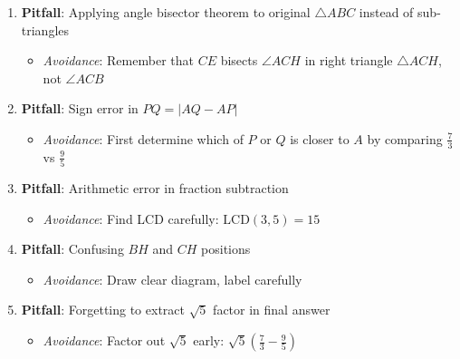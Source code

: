 \documentclass[12pt]{article}
\begin{document}
\begin{roadmapbox}
\begin{enumerate}
    \item \textbf{Pitfall}: Applying angle bisector theorem to original $\triangle ABC$ instead of sub-triangles
    \begin{itemize}
        \item \textit{Avoidance}: Remember that $CE$ bisects $\angle ACH$ in right triangle $\triangle ACH$, not $\angle ACB$
    \end{itemize}
    \item \textbf{Pitfall}: Sign error in $PQ = |AQ - AP|$
    \begin{itemize}
        \item \textit{Avoidance}: First determine which of $P$ or $Q$ is closer to $A$ by comparing $\frac{7}{3}$ vs $\frac{9}{5}$
    \end{itemize}
    \item \textbf{Pitfall}: Arithmetic error in fraction subtraction
    \begin{itemize}
        \item \textit{Avoidance}: Find LCD carefully: $\text{LCD}(3,5) = 15$
    \end{itemize}
    \item \textbf{Pitfall}: Confusing $BH$ and $CH$ positions
    \begin{itemize}
        \item \textit{Avoidance}: Draw clear diagram, label carefully
    \end{itemize}
    \item \textbf{Pitfall}: Forgetting to extract $\sqrt{5}$ factor in final answer
    \begin{itemize}
        \item \textit{Avoidance}: Factor out $\sqrt{5}$ early: $\sqrt{5}(\frac{7}{3} - \frac{9}{5})$
    \end{itemize}
\end{enumerate}
\end{roadmapbox}
\end{document}

